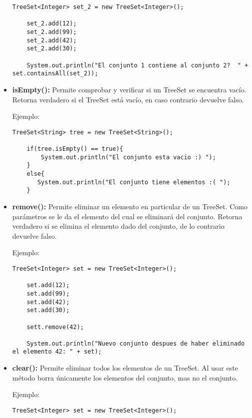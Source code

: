 \documentclass[12pt, letterpaper]{article} %
\begin{document}
\begin{itemize}
\begin{lstlisting}[frame=single]
    TreeSet<Integer> set_2 = new TreeSet<Integer>();

    set_2.add(12);
    set_2.add(99);
    set_2.add(42);
    set_2.add(30);

    System.out.println("El conjunto 1 contiene al conjunto 2?  " +  set.containsAll(set_2));
    \end{lstlisting}

    \item \textbf{isEmpty():} Permite comprobar y verificar si un TreeSet se encuentra vacío. Retorna verdadero si el TreeSet está vacío, en caso contrario devuelve falso.
    
    Ejemplo:
    \lstset{language = Java, breaklines=true, basicstyle=\footnotesize}
    \begin{lstlisting}[frame=single]
    TreeSet<String> tree = new TreeSet<String>();

    if(tree.isEmpty() == true){
        System.out.println("El conjunto esta vacio :) ");
    }
    else{
	   System.out.println("El conjunto tiene elementos :( ");
    }
    \end{lstlisting}

    \item \textbf{remove():} Permite eliminar un elemento en particular de un TreeSet. Como parámetros se le da el elemento del cual se eliminará del conjunto. Retorna verdadero si se elimina el elemento dado del conjunto, de lo contrario devuelve falso.
    
    Ejemplo:
    \vspace{15mm}
    \lstset{language = Java, breaklines=true, basicstyle=\footnotesize}
    \begin{lstlisting}[frame=single]
    TreeSet<Integer> set = new TreeSet<Integer>();

    set.add(12);
    set.add(99);
    set.add(42);
    set.add(30);

    sett.remove(42);

    System.out.println("Nuevo conjunto despues de haber eliminado el elemento 42: " + set);
    \end{lstlisting}

    \item \textbf{clear():} Permite eliminar todos los elementos de un TreeSet. Al usar este método borra únicamente los elementos del conjunto, mas no el conjunto.

    Ejemplo:
    \lstset{language = Java, breaklines=true, basicstyle=\footnotesize}
    \begin{lstlisting}[frame=single]
    TreeSet<Integer> set = new TreeSet<Integer>();


\end{lstlisting}
\end{itemize}
\end{document}
